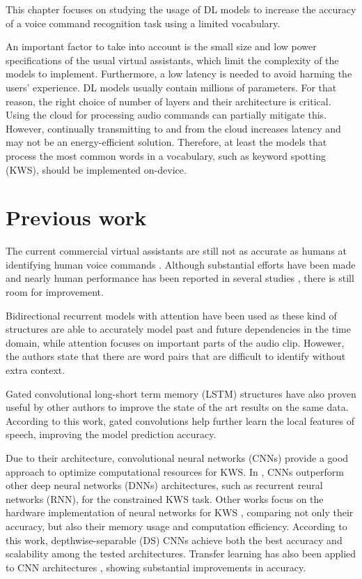 This chapter focuses on studying the usage of DL models to increase the accuracy of a voice command recognition task using a limited vocabulary.

An important factor to take into account is the small size and low power specifications of the usual virtual assistants, which limit the complexity of the models to implement. Furthermore, a low latency is needed to avoid harming the users' experience. DL models usually contain millions of parameters. For that reason, the right choice of number of layers and their architecture is critical. Using the cloud for processing audio commands can partially mitigate this. However, continually transmitting to and from the cloud increases latency and may not be an energy-efficient solution. Therefore, at least the models that process the most common words in a vocabulary, such as keyword spotting (KWS), should be implemented on-device.

\section{Previous work}
The current commercial virtual assistants are still not as accurate as humans at identifying human voice commands \autocite{Michaely2017}. Although substantial efforts have been made and nearly human performance has been reported in several studies \autocite{Andrade2018, Zhang2017, Mcmahan2017, Warden2018}, there is still room for improvement. 

Bidirectional recurrent models with attention have been used \autocite{Andrade2018} as these kind of structures are able to accurately model past and future dependencies in the time domain, while attention focuses on important parts of the audio clip. Howewer, the authors state that there are word pairs that are difficult to identify without extra context.

Gated convolutional long-short term memory (LSTM) structures have also proven useful by other authors \autocite{Wang2018} to improve the state of the art results on the same data. According to this work, gated convolutions help further learn the local features of speech, improving the model prediction accuracy.

Due to their architecture, convolutional neural networks (CNNs) provide a good approach to optimize computational resources for KWS. In \autocite{Tara2015}, CNNs outperform other deep neural networks (DNNs) architectures, such as recurrent reural networks (RNN), for the constrained KWS task. Other works focus on the hardware implementation of neural networks for KWS \autocite{Zhang2017}, comparing not only their accuracy, but also their memory usage and computation efficiency. According to this work, depthwise-separable (DS) CNNs achieve both the best accuracy and scalability among the tested architectures.  Transfer learning has also been applied to CNN architectures \autocite{Mcmahan2017}, showing substantial improvements in accuracy.

